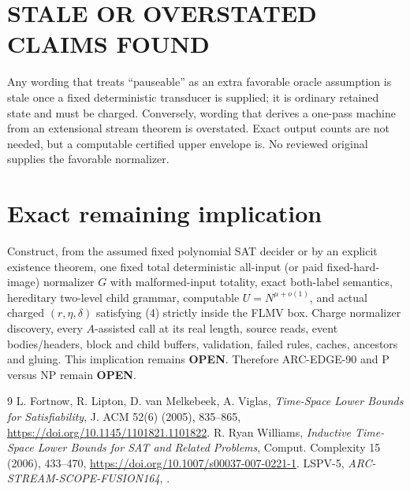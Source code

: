 \documentclass[11pt]{article}
\newcommand{\OPEN}{\textbf{OPEN}}
\begin{document}
\section{STALE OR OVERSTATED CLAIMS FOUND}
Any wording that treats ``pauseable'' as an extra favorable oracle assumption is
stale once a fixed deterministic transducer is supplied; it is ordinary retained
state and must be charged.  Conversely, wording that derives a one-pass machine
from an extensional stream theorem is overstated.  Exact output counts are not
needed, but a computable certified upper envelope is.  No reviewed original
supplies the favorable normalizer.

\section{Exact remaining implication}
Construct, from the assumed fixed polynomial SAT decider or by an explicit
existence theorem, one fixed total deterministic all-input (or paid fixed-hard-
image) normalizer $G$ with malformed-input totality, exact both-label semantics,
hereditary two-level child grammar, computable $U=N^{\mu+o(1)}$, and actual
charged $(r,\eta,\delta)$ satisfying (4) strictly inside the FLMV box.  Charge
normalizer discovery, every $A$-assisted call at its real length, source reads,
event bodies/headers, block and child buffers, validation, failed rules, caches,
ancestors and gluing.  This implication remains \OPEN.  Therefore ARC-EDGE-90
and P versus NP remain \OPEN.

\begin{thebibliography}{9}
 L. Fortnow, R. Lipton, D. van Melkebeek, A. Viglas,
\emph{Time-Space Lower Bounds for Satisfiability}, J. ACM 52(6) (2005),
835--865, \url{https://doi.org/10.1145/1101821.1101822}.
 R. Ryan Williams, \emph{Inductive Time-Space Lower Bounds
for SAT and Related Problems}, Comput. Complexity 15 (2006), 433--470,
\url{https://doi.org/10.1007/s00037-007-0221-1}.
 LSPV-5, \emph{ARC-STREAM-SCOPE-FUSION164},
.
\end{thebibliography}
\end{document}
